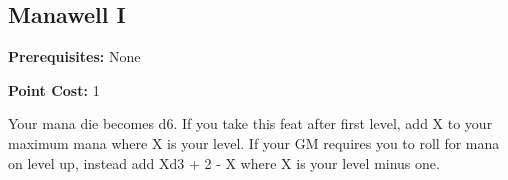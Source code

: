 \subsection{Manawell I}\label{feat:manawell1}

\noindent
\textbf{Prerequisites:} None

\noindent
\textbf{Point Cost:} 1 

Your mana die becomes d6. If you take this feat after first level, add X to
your maximum mana where X is your level. If your GM requires you to roll for
mana on level up, instead add Xd3 + 2 - X where X is your level minus one.
